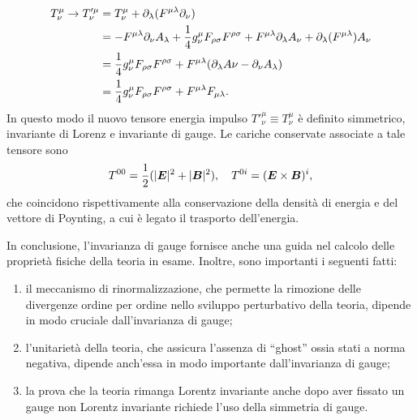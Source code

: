 \begin{equation}
    \begin{split}
        T^\mu_\nu \to T'^\mu_\nu &= T^\mu_\nu + \partial_\lambda(F^{\mu\lambda}\partial_\nu) \\
        &= -F^{\mu\lambda}\partial_\nu A_\lambda + \frac{1}{4}g^\mu_\nu F_{\rho\sigma}F^{\rho\sigma} + F^{\mu\lambda}\partial_\lambda A_\nu + \partial_\lambda(F^{\mu\lambda})A_\nu \\
        &= \frac{1}{4}g^\mu_\nu F_{\rho\sigma}F^{\rho\sigma} + F^{\mu\lambda}(\partial_\lambda A\nu - \partial_\nu A_\lambda) \\
        &= \frac{1}{4}g^\mu_\nu F_{\rho\sigma}F^{\rho\sigma} + F^{\mu\lambda}F_{\mu\lambda}.
    \end{split}
\end{equation}
In questo modo il nuovo tensore energia impulso $T'^\mu_\nu \equiv T^\mu_\nu$ è definito simmetrico, invariante di Lorenz e invariante di gauge. Le cariche conservate associate a tale tensore sono 
\begin{equation}
    T^{00} = \frac{1}{2}(|\bm{E}|^2 + |\bm{B}|^2), \quad T^{0i} = (\bm{E} \times \bm{B})^i,
\end{equation}
che coincidono rispettivamente alla conservazione della densità di energia e del vettore di Poynting, a cui è legato il trasporto dell'energia. 

In conclusione, l'invarianza di gauge fornisce anche una guida nel calcolo delle proprietà fisiche della teoria in esame. Inoltre, sono importanti i seguenti fatti:
\begin{enumerate}
    \item il meccanismo di rinormalizzazione, che permette la rimozione delle divergenze ordine per ordine nello sviluppo perturbativo della teoria, dipende in modo cruciale dall'invarianza di gauge;
    \item l'unitarietà della teoria, che assicura l'assenza di ``ghost'' ossia stati a norma negativa, dipende anch'essa in modo importante dall'invarianza di gauge;
    \item la prova che la teoria rimanga Lorentz invariante anche dopo aver fissato un gauge non Lorentz invariante richiede l'uso della simmetria di gauge. 
\end{enumerate}

